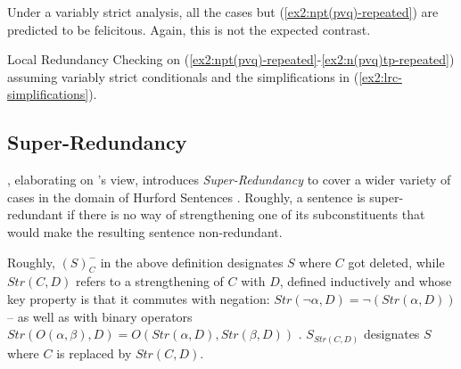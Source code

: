 Under a variably strict analysis, all the cases but (\ref{ex2:npt(pvq)-repeated}) are predicted to be felicitous. Again, this is not the expected contrast.

\begin{exe}
	\ex\label{ex2:lrc-vstrict} Local Redundancy Checking on (\ref{ex2:npt(pvq)-repeated}-\ref{ex2:n(pvq)tp-repeated}) assuming variably strict conditionals and the simplifications in (\ref{ex2:lrc-simplifications}).
	\begin{xlist}
	\end{xlist}
\end{exe}


\subsection{Super-Redundancy}
\citet{Kalomoiros2024}, elaborating on \citet{Katzir2014}'s view, introduces \textit{Super-Redundancy} to cover a wider variety of cases in the domain of Hurford Sentences \citep{Hurford1974,Marty2022,Mandelkern2018}. Roughly, a sentence is super-redundant if there is no way of strengthening one of its subconstituents that would make the resulting sentence non-redundant. 


\begin{exe}
\end{exe}
Roughly, $(S)^-_C$ in the above definition designates $S$ where $C$ got deleted, while $Str(C, D)$ refers to a strengthening of $C$ with $D$, defined inductively and whose key property is that it commutes with negation: $Str(\neg\alpha, D) = \neg (Str(\alpha, D))$ -- as well as with binary operators $Str(O(\alpha, \beta), D) = O(Str(\alpha, D), Str(\beta, D))$ . $S_{Str(C, D)}$ designates $S$ where $C$ is replaced by $Str(C, D)$.


